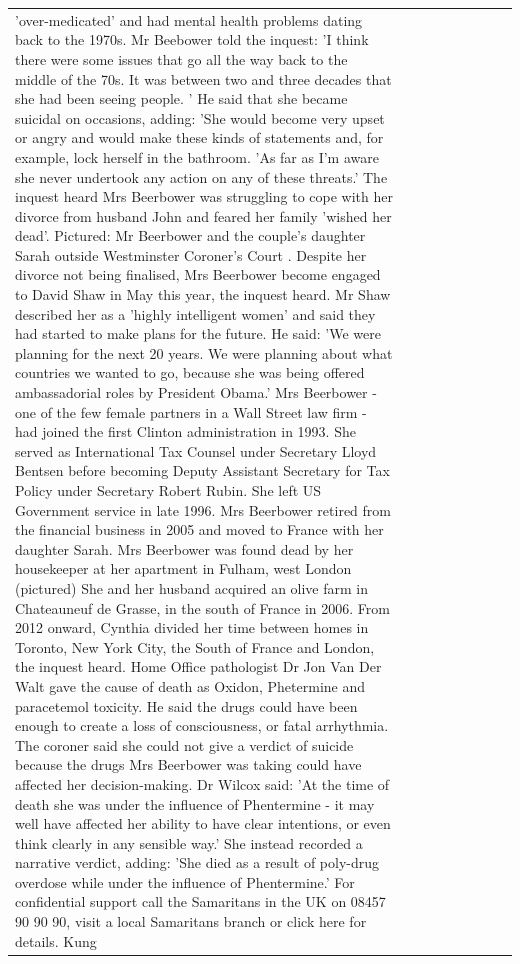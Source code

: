 \begin{table}[H]
\begin{tabular}{lllrlllll}
'over-medicated' and had mental health problems dating back to the 1970s. Mr Beebower told the inquest: 'I think there were some issues that go all the way back to the middle of the 70s. It was between two and three decades that she had been seeing people. ' He said that she became suicidal on occasions, adding: 'She would become very upset or angry and would make these kinds of statements and, for example, lock herself in the bathroom. 'As far as I'm aware she never undertook any action on any of these threats.' The inquest heard Mrs Beerbower was struggling to cope with her divorce from husband John and feared her family 'wished her dead'. Pictured: Mr Beerbower and the couple's daughter Sarah outside Westminster Coroner's Court . Despite her divorce not being finalised, Mrs Beerbower become engaged to David Shaw in May this year, the inquest heard. Mr Shaw described her as a 'highly intelligent women' and said they had started to make plans for the future. He said: 'We were planning for the next 20 years. We were planning about what countries we wanted to go, because she was being offered ambassadorial roles by President Obama.' Mrs Beerbower - one of the few female partners in a Wall Street law firm - had joined the first Clinton administration in 1993. She served as International Tax Counsel under Secretary Lloyd Bentsen before becoming Deputy Assistant Secretary for Tax Policy under Secretary Robert Rubin. She left US Government service in late 1996. Mrs Beerbower retired from the financial business in 2005 and moved to France with her daughter Sarah. Mrs Beerbower was found dead by her housekeeper at her apartment in Fulham, west London (pictured) She and her husband acquired an olive farm in Chateauneuf de Grasse, in the south of France in 2006. From 2012 onward, Cynthia divided her time between homes in Toronto, New York City, the South of France and London, the inquest heard. Home Office pathologist Dr Jon Van Der Walt gave the cause of death as Oxidon, Phetermine and paracetemol toxicity. He said the drugs could have been enough to create a loss of consciousness, or fatal arrhythmia. The coroner said she could not give a verdict of suicide because the drugs Mrs Beerbower was taking could have affected her decision-making. Dr Wilcox said: 'At the time of death she was under the influence of Phentermine - it may well have affected her ability to have clear intentions, or even think clearly in any sensible way.' She instead recorded a narrative verdict, adding: 'She died as a result of poly-drug overdose while under the influence of Phentermine.' For confidential support call the Samaritans in the UK on 08457 90 90 90, visit a local Samaritans branch or click here for details. Kung \\

\end{tabular}
\end{table}
